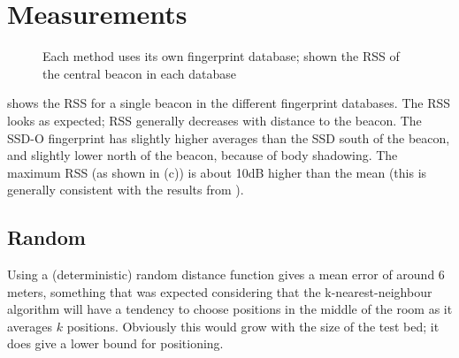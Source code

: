 \section{Measurements}
\label{sec:architecture-measurements}
\begin{figure}[p]
    \begin{subfigure}[b]{0.5\textwidth}
    \end{subfigure}
    \begin{subfigure}[b]{0.5\textwidth}
    \end{subfigure}
    \begin{subfigure}[b]{0.5\textwidth}
    \end{subfigure}
    \begin{subfigure}[b]{0.5\textwidth}
    \end{subfigure}
    \begin{subfigure}[b]{0.5\textwidth}
    \end{subfigure}
    \begin{subfigure}[b]{0.5\textwidth}
    \end{subfigure}
    \caption{Each method uses its own fingerprint database; shown the RSS of the central beacon in each database}
    \label{fig:architecture-heatmaps}
\end{figure}

 shows the RSS for a single beacon in the different fingerprint databases.
The RSS looks as expected; RSS generally decreases with distance to the beacon.
The SSD-O fingerprint has slightly higher averages than the SSD south of the beacon, and slightly lower north of the beacon, because of body shadowing.
The maximum RSS (as shown in (c)) is about 10dB higher than the mean (this is generally consistent with the results from ).


\subsection{Random}
Using a (deterministic) random distance function gives a mean error of around 6 meters, something that was expected considering that the k-nearest-neighbour algorithm will have a tendency to choose positions in the middle of the room as it averages $k$ positions.
Obviously this would grow with the size of the test bed; it does give a lower bound for positioning.
